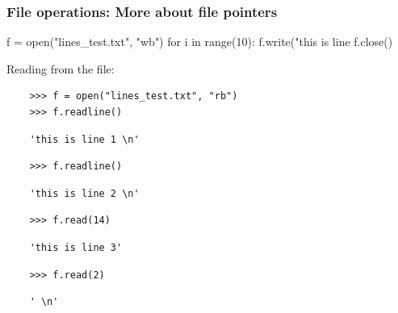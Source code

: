 \documentclass[xcolor=table,10pt]{beamer}
\begin{document}
\begin{frame}[fragile]

  \frametitle{File operations: More about file pointers}

  \begin{mlinepython}
    f = open("lines_test.txt", "wb")
    for i in range(10):
        f.write("this is line %
    f.close()
  \end{mlinepython}
  \pause
  \bigskip

  Reading from the file:
  \smallskip

  \begin{verbatim}
    >>> f = open("lines_test.txt", "rb")
    >>> f.readline()
  \end{verbatim}
  \pause
  \vspace{-10pt}
  \begin{verbatim}
    'this is line 1 \n'
  \end{verbatim}
  \pause
  \vspace{-10pt}
  \begin{verbatim}
    >>> f.readline()
  \end{verbatim}
  \pause
  \vspace{-10pt}
  \begin{verbatim}
    'this is line 2 \n'
  \end{verbatim}
  \pause
  \vspace{-10pt}
  \begin{verbatim}
    >>> f.read(14)
  \end{verbatim}
  \pause
  \vspace{-10pt}
  \begin{verbatim}
    'this is line 3'
  \end{verbatim}
  \pause
  \vspace{-10pt}
  \begin{verbatim}
    >>> f.read(2)
  \end{verbatim}
  \pause
  \vspace{-10pt}
  \begin{verbatim}
    ' \n'
  \end{verbatim}

\end{frame}
\end{document}
